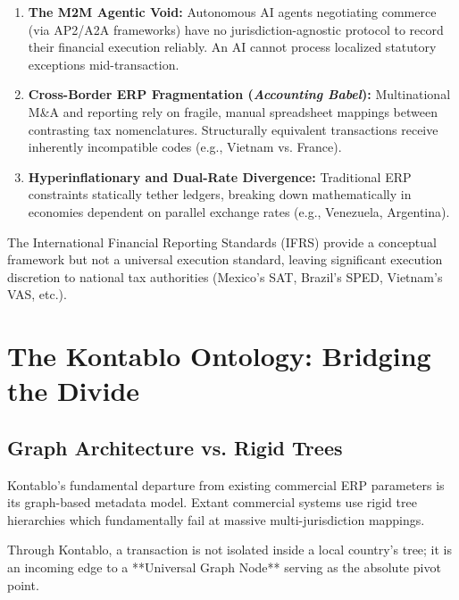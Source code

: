 \documentclass[12pt]{article}
\begin{document}
\begin{enumerate}
    \item \textbf{The M2M Agentic Void:} Autonomous AI agents negotiating commerce (via AP2/A2A frameworks) have no jurisdiction-agnostic protocol to record their financial execution reliably. An AI cannot process localized statutory exceptions mid-transaction.
    \item \textbf{Cross-Border ERP Fragmentation (\textit{Accounting Babel}):} Multinational M\&A and reporting rely on fragile, manual spreadsheet mappings between contrasting tax nomenclatures. Structurally equivalent transactions receive inherently incompatible codes (e.g., Vietnam vs. France).
    \item \textbf{Hyperinflationary and Dual-Rate Divergence:} Traditional ERP constraints statically tether ledgers, breaking down mathematically in economies dependent on parallel exchange rates (e.g., Venezuela, Argentina).
\end{enumerate}

The International Financial Reporting Standards (IFRS) provide a conceptual framework but not a universal execution standard, leaving significant execution discretion to national tax authorities (Mexico's SAT, Brazil's SPED, Vietnam's VAS, etc.).

\section{The Kontablo Ontology: Bridging the Divide}

\subsection{Graph Architecture vs. Rigid Trees}
Kontablo's fundamental departure from existing commercial ERP parameters is its graph-based metadata model. Extant commercial systems use rigid tree hierarchies which fundamentally fail at massive multi-jurisdiction mappings.

Through Kontablo, a transaction is not isolated inside a local country's tree; it is an incoming edge to a **Universal Graph Node** serving as the absolute pivot point.
\end{document}

